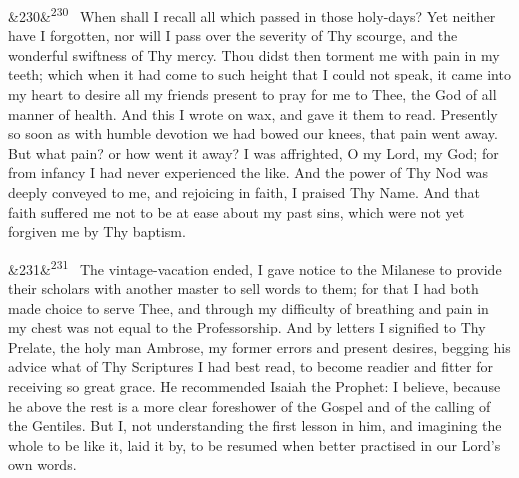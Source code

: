 \documentclass[12pt]{article}
\newcommand{\para}[1][]{\par\noindent\ifx&#1&\else\textsuperscript{\footnotesize #1}~\fi}
\begin{document}
\para[230] When shall I recall all which passed in those holy-days? Yet neither have I forgotten, nor will I pass over the severity of Thy scourge, and the wonderful swiftness of Thy mercy. Thou didst then torment me with pain in my teeth; which when it had come to such height that I could not speak, it came into my heart to desire all my friends present to pray for me to Thee, the God of all manner of health. And this I wrote on wax, and gave it them to read. Presently so soon as with humble devotion we had bowed our knees, that pain went away. But what pain? or how went it away? I was affrighted, O my Lord, my God; for from infancy I had never experienced the like. And the power of Thy Nod was deeply conveyed to me, and rejoicing in faith, I praised Thy Name. And that faith suffered me not to be at ease about my past sins, which were not yet forgiven me by Thy baptism.

\para[231] The vintage-vacation ended, I gave notice to the Milanese to provide their scholars with another master to sell words to them; for that I had both made choice to serve Thee, and through my difficulty of breathing and pain in my chest was not equal to the Professorship. And by letters I signified to Thy Prelate, the holy man Ambrose, my former errors and present desires, begging his advice what of Thy Scriptures I had best read, to become readier and fitter for receiving so great grace. He recommended Isaiah the Prophet: I believe, because he above the rest is a more clear foreshower of the Gospel and of the calling of the Gentiles. But I, not understanding the first lesson in him, and imagining the whole to be like it, laid it by, to be resumed when better practised in our Lord's own words.
\end{document}
